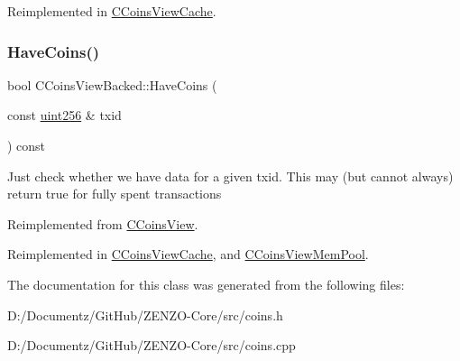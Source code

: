 Reimplemented in \mbox{\hyperlink{class_c_coins_view_cache_a561bb7c6c97701b12c48fbbb563d0a91}{C\+Coins\+View\+Cache}}.

\mbox{\label{class_c_coins_view_backed_ad49041658bdec807d556e080476e6543}} 
\subsubsection{\texorpdfstring{HaveCoins()}{HaveCoins()}}
{\footnotesize\ttfamily bool C\+Coins\+View\+Backed\+::\+Have\+Coins (\begin{DoxyParamCaption}\item[{const \mbox{\hyperlink{classuint256}{uint256}} \&}]{txid }\end{DoxyParamCaption}) const\hspace{0.3cm}{\ttfamily [virtual]}}

Just check whether we have data for a given txid. This may (but cannot always) return true for fully spent transactions 

Reimplemented from \mbox{\hyperlink{class_c_coins_view_ade3a65fc3f1b02baf7bebce630e4eba3}{C\+Coins\+View}}.



Reimplemented in \mbox{\hyperlink{class_c_coins_view_cache_aa8f0c55b6fc207d2188948a565125ab7}{C\+Coins\+View\+Cache}}, and \mbox{\hyperlink{class_c_coins_view_mem_pool_a2c5900448dc5570053060686ad1f014b}{C\+Coins\+View\+Mem\+Pool}}.



The documentation for this class was generated from the following files\+:\begin{DoxyCompactItemize}
\item 
D\+:/\+Documentz/\+Git\+Hub/\+Z\+E\+N\+Z\+O-\/\+Core/src/coins.\+h\item 
D\+:/\+Documentz/\+Git\+Hub/\+Z\+E\+N\+Z\+O-\/\+Core/src/coins.\+cpp\end{DoxyCompactItemize}
